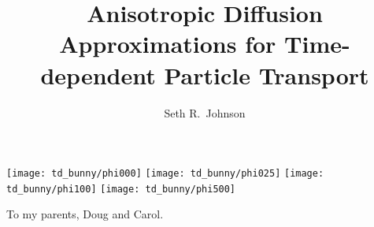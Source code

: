 \documentclass[twoside]{umthesis}
\author{Seth R.~Johnson}
\title{Anisotropic Diffusion Approximations for Time-dependent Particle
Transport%
}
\begin{document}
\allowdisplaybreaks
\setlength{\parskip}{0pt plus 0pt minus 0pt}

\frontmatter

\maketitle


\begin{frontispiece}
  \centering
  \texttt{[image: td\_bunny/phi000]}%
  \texttt{[image: td\_bunny/phi025]}
  \texttt{[image: td\_bunny/phi100]}%
  \texttt{[image: td\_bunny/phi500]}
\end{frontispiece}

\makecopyright
  

\begin{dedication}
  To my parents, Doug and Carol.
\end{dedication}

\end{document}
